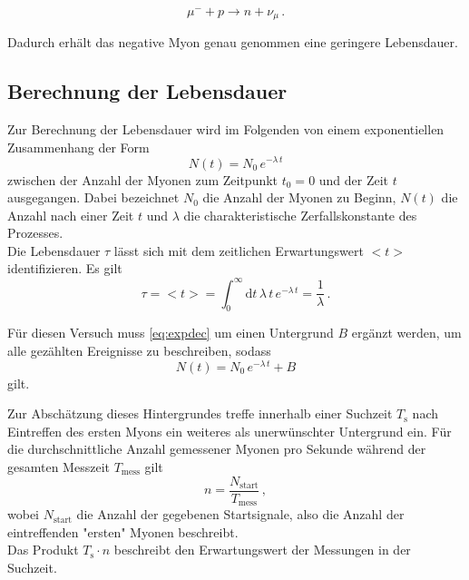 \begin{equation*}
    \mu^- + p \rightarrow n + \nu_\mu \,.
\end{equation*}

Dadurch erhält das negative Myon genau genommen eine geringere Lebensdauer.


\subsection{Berechnung der Lebensdauer}

Zur Berechnung der Lebensdauer wird im Folgenden von einem exponentiellen Zusammenhang der Form
\begin{equation}
    N(t) = N_0 \, e^{-\lambda \, t}
    \label{eq:expdec}
\end{equation}
zwischen der Anzahl der Myonen zum Zeitpunkt $t_0 = 0$ und der Zeit $t$ ausgegangen. 
Dabei bezeichnet $N_0$ die Anzahl der Myonen zu Beginn, $N(t)$ die Anzahl nach einer Zeit $t$ und $\lambda$ die charakteristische Zerfallskonstante des Prozesses. \\

Die Lebensdauer $\tau$ lässt sich mit dem zeitlichen Erwartungswert $<t>$ identifizieren.
Es gilt
\begin{equation}
    \tau = <t> = \int_0^\infty \text{d} t \, \lambda \, t \, e^{-\lambda \, t} = \frac{1}{\lambda} \,.
\end{equation} 

Für diesen Versuch muss \eqref{eq:expdec} um einen Untergrund $B$ ergänzt werden, um alle gezählten Ereignisse zu beschreiben, sodass
\begin{equation}
    N(t) = N_0 \, e^{-\lambda \, t} + B
\end{equation}
gilt.

Zur Abschätzung dieses Hintergrundes treffe innerhalb einer Suchzeit $T_\text{s}$ nach Eintreffen des ersten Myons ein weiteres als unerwünschter Untergrund ein.
Für die durchschnittliche Anzahl gemessener Myonen pro Sekunde während der gesamten Messzeit $T_\text{mess}$ gilt
\begin{equation*}
    n = \frac{N_\text{start}}{T_\text{mess}} \,,
\end{equation*}
wobei $N_\text{start}$ die Anzahl der gegebenen Startsignale, also die Anzahl der eintreffenden "ersten" Myonen beschreibt. \\

Das Produkt $T_\text{s} \cdot n$ beschreibt den Erwartungswert der Messungen in der Suchzeit. \\

